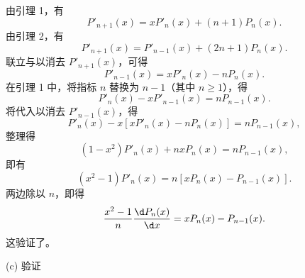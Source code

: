 \begin{myproof}
    由引理 1，有
    \begin{equation}\label{eq:proof-b-1}
        P'_{n+1}(x) = x P'_n(x) + (n+1) P_n(x).
    \end{equation}
    由引理 2，有
    \begin{equation}\label{eq:proof-b-2}
        P'_{n+1}(x) = P'_{n-1}(x) + (2n+1) P_n(x).
    \end{equation}
    联立与以消去 $P'_{n+1}(x)$，可得
    \begin{equation}\label{eq:proof-b-3}
        P'_{n-1}(x) = x P'_n(x) - n P_n(x).
    \end{equation}
    在引理 1 中，将指标 $n$ 替换为 $n-1$（其中 $n \geqslant 1$），得
    \begin{equation}\label{eq:proof-b-4}
        P'_n(x) - x P'_{n-1}(x) = n P_{n-1}(x).
    \end{equation}
    将代入以消去 $P'_{n-1}(x)$，得
    \begin{equation}\label{eq:proof-b-5}
        P'_n(x) - x \left[ x P'_n(x) - n P_n(x) \right] = n P_{n-1}(x),
    \end{equation}
    整理得
    \begin{equation}\label{eq:proof-b-6}
        (1 - x^2) P'_n(x) + n x P_n(x) = n P_{n-1}(x),
    \end{equation}
    即有
    \begin{equation}\label{eq:proof-b-7}
        (x^2 - 1) P'_n(x) = n \left[ x P_n(x) - P_{n-1}(x) \right].
    \end{equation}
    两边除以 $n$，即得
    \begin{equation}\label{eq:proof-b-final}
        \frac{x^2 - 1}{n} \frac{\d P_n(x)}{\d x} = x P_n(x) - P_{n-1}(x).
    \end{equation}
    这验证了。

    (c) 验证


\end{myproof}
